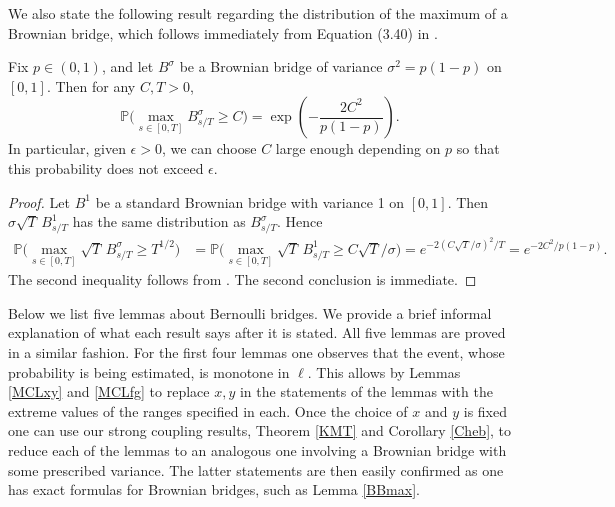 We also state the following result regarding the distribution of the maximum of a Brownian bridge, which follows immediately from Equation (3.40) in \cite[Chapter 4]{KS}.

\begin{lemma}\label{BBmax}
	Fix $p\in (0,1)$, and let $B^\sigma$ be a Brownian bridge of variance $\sigma^2 = p(1-p)$ on $[0,1]$. Then for any $C,T> 0$,
	\[
	\mathbb{P}\Big(\max_{s\in[0,T]} B^\sigma_{s/T} \geq C\Big) = \exp\left( - \frac{2C^2}{p(1-p)}\right).
	\]
	In particular, given $\epsilon > 0$, we can choose $C$ large enough depending on $p$ so that this probability does not exceed $\epsilon$.
\end{lemma}

\begin{proof}
	Let $B^1$ be a standard Brownian bridge with variance 1 on $[0,1]$. Then $\sigma\sqrt{T}\,B^1_{s/T}$ has the same distribution as $B^\sigma_{s/T}$. Hence
	\begin{align*}
	\mathbb{P}\Big( \max_{s\in[0,T]} \sqrt{T}\,B^\sigma_{s/T} \geq T^{1/2} \Big) &= \mathbb{P}\Big( \max_{s\in[0,T]} \sqrt{T}\,B^1_{s/T} \geq C\sqrt{T}/\sigma \Big) = e^{-2(C\sqrt{T}/\sigma)^2/T} = e^{-2C^2/p(1-p)}.
	\end{align*}
	The second inequality follows from \cite[Chapter 4, (3.40)]{KS}. The second conclusion is immediate.
\end{proof}

Below we list five lemmas about Bernoulli bridges. We provide a brief informal explanation of what each result says after it is stated. All five lemmas are proved in a similar fashion. For the first four lemmas one observes that the event, whose probability is being estimated, is monotone in $\ell$. This allows by Lemmas \ref{MCLxy} and \ref{MCLfg} to replace $x,y$ in the statements of the lemmas with the extreme values of the ranges specified in each. Once the choice of $x$ and $y$ is fixed one can use our strong coupling results, Theorem \ref{KMT} and Corollary \ref{Cheb}, to reduce each of the lemmas to an analogous one involving a Brownian bridge with some prescribed variance. The latter statements are then easily confirmed as one has exact formulas for Brownian bridges, such as Lemma \ref{BBmax}.\\

